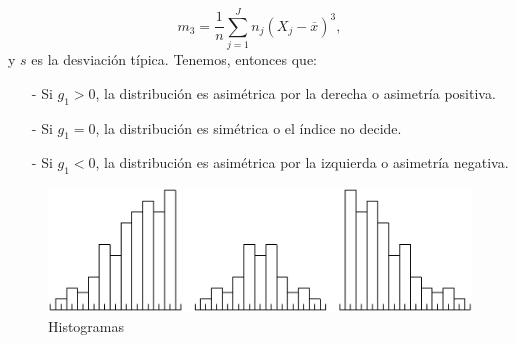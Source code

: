 \documentclass[12pt]{report}
\begin{document}
$$m_3=\frac{1}{n}\sum\limits_{j=1}^{J} n_j(X_j-\overline{x})^3,$$
y $s$ es la desviación típica. Tenemos, entonces  que:
\begin{itemize}
\item[-] Si $g_1>0$, la distribución
es asimétrica por la derecha o asimetría positiva.

\item[-] Si $g_1=0$, la distribución
es simétrica o el  índice no decide.

\item[-] Si $g_1<0$, la distribución
es asimétrica por la izquierda o asimetría negativa.
\end{itemize}
\begin{figure}
\begin{center}
\includegraphics{histogramas2.eps}
\end{center} \caption{Histogramas}
\end{figure}
\end{document}
